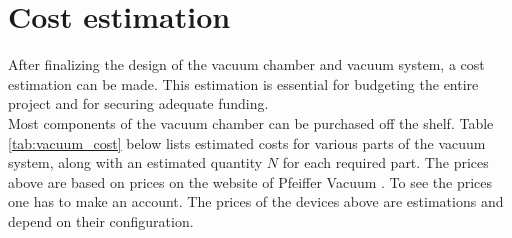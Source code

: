 \chapter{Cost estimation}

After finalizing the design of the vacuum chamber and vacuum system, a cost estimation can be made. This estimation is essential for budgeting the entire project and for securing adequate funding.\\

\noindent Most components of the vacuum chamber can be purchased off the shelf. Table \ref{tab:vacuum_cost} below lists estimated costs for various parts of the vacuum system, along with an estimated quantity $N$ for each required part.
The prices above are based on prices on the website of Pfeiffer Vacuum \cite{pfeiffervacuum}. To see the prices one has to make an account. The prices of the devices above are estimations and depend on their configuration.


